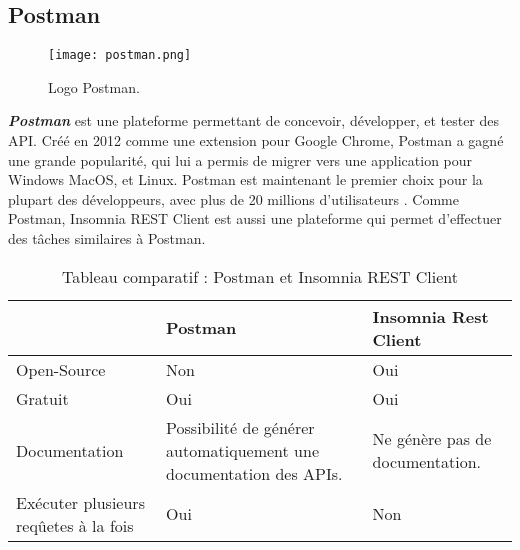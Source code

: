 \subsection{Postman}
\begin{figure}[H]
    \centering
    \texttt{[image: postman.png]}
    \vspace{1cm}
    \captionsetup{justification=centering}
    \caption{Logo Postman.}
    \label{fig:postman_logo}
\end{figure}
\textit{\textbf{Postman}} \cite{postman} est une plateforme permettant de concevoir, développer, et tester des API. Créé en 2012 comme une extension pour Google Chrome, Postman a gagné une grande popularité, qui lui a permis de migrer vers une application pour Windows MacOS, et Linux. Postman est maintenant le premier choix pour la plupart des développeurs, avec plus de 20 millions d'utilisateurs \cite{postman_users}.
Comme Postman, Insomnia REST Client\cite{insomnia} est aussi une plateforme qui permet d'effectuer des tâches similaires à Postman.
\begin{table}[H]
    \begin{tabularx}{\textwidth} {
            | >{\centering\arraybackslash}X
            | >{\centering\arraybackslash}X
            | >{\centering\arraybackslash}X |}
        \hline
                                              & Postman                                                            & Insomnia Rest Client            \\
        \hline
        Open-Source                           & Non                                                                & Oui                             \\
        \hline
        Gratuit                               & Oui                                                                & Oui                             \\
        \hline
        Documentation                         & Possibilité de générer automatiquement une documentation des APIs. & Ne génère pas de documentation. \\
        \hline
        Exécuter plusieurs reqûetes à la fois & Oui                                                                & Non                             \\
        \hline
    \end{tabularx}
    \captionsetup{justification=centering}
    \caption{Tableau comparatif : Postman et Insomnia REST Client}
    \label{tab:comparaison_postman_insomnia}
\end{table}
